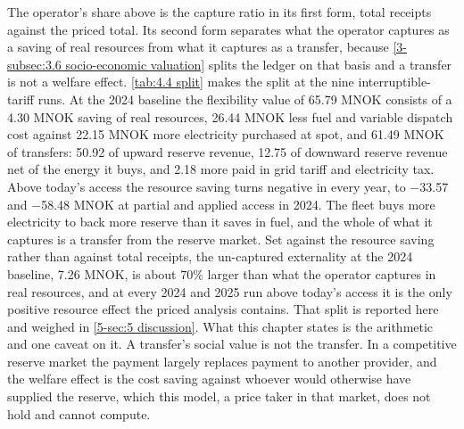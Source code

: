 The operator's share above is the capture ratio in its first form, total receipts against the priced total. Its second form separates what the operator captures as a saving of real resources from what it captures as a transfer, because \autoref{3-subsec:3.6 socio-economic valuation} splits the ledger on that basis and a transfer is not a welfare effect. \autoref{tab:4.4 split} makes the split at the nine interruptible-tariff runs. At the 2024 baseline the flexibility value of 65.79 MNOK consists of a 4.30 MNOK saving of real resources, 26.44 MNOK less fuel and variable dispatch cost against 22.15 MNOK more electricity purchased at spot, and 61.49 MNOK of transfers: 50.92 of upward reserve revenue, 12.75 of downward reserve revenue net of the energy it buys, and 2.18 more paid in grid tariff and electricity tax. Above today's access the resource saving turns negative in every year, to $-$33.57 and $-$58.48 MNOK at partial and applied access in 2024. The fleet buys more electricity to back more reserve than it saves in fuel, and the whole of what it captures is a transfer from the reserve market. Set against the resource saving rather than against total receipts, the un-captured externality at the 2024 baseline, 7.26 MNOK, is about $70\%$ larger than what the operator captures in real resources, and at every 2024 and 2025 run above today's access it is the only positive resource effect the priced analysis contains. That split is reported here and weighed in \autoref{5-sec:5 discussion}. What this chapter states is the arithmetic and one caveat on it. A transfer's social value is not the transfer. In a competitive reserve market the payment largely replaces payment to another provider, and the welfare effect is the cost saving against whoever would otherwise have supplied the reserve, which this model, a price taker in that market, does not hold and cannot compute.

